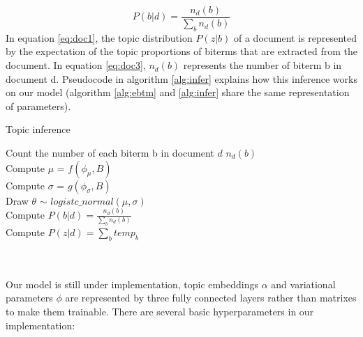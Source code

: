 \begin{equation}
    P(b|d) = \frac{n_d(b)}{\sum_bn_d(b)}
\label{eq:doc3}
\end{equation}
In equation \ref{eq:doc1}, the topic distribution $P(z|b)$ of a document is represented by the expectation of the topic proportions of biterms that are extracted from the document. In equation \ref{eq:doc3}, $n_d(b)$ represents the number of biterm b in document d. Pseudocode in algorithm \ref{alg:infer} explains how this inference works on our model (algorithm \ref{alg:ebtm} and \ref{alg:infer} share the same representation of parameters).
\begin{algorithm}[!htbp]
    \caption{Topic inference}
    \label{alg:infer}
    \LinesNumbered
    Count the number of each biterm b in document $d$ $n_d(b)$\\
    Compute $\mu$ = $f(\phi_{\mu},B)$\\
    Compute $\sigma$ = $g(\phi_{\sigma},B)$\\ 
    Draw $\theta$ $\sim$ $logistc\_normal(\mu,\sigma)$\\
    {
        Compute $P(b|d) = \frac{n_d(b)}{\sum_bn_d(b)}$\\
    }
    {
        Compute $P(z|d) = \sum_b temp_b$
    }
\end{algorithm}
\\\\Our model is still under implementation, topic embeddings $\alpha$ and variational parameters $\phi$ are represented by three fully connected layers rather than matrixes to make them trainable. There are several basic hyperparameters in our implementation:
